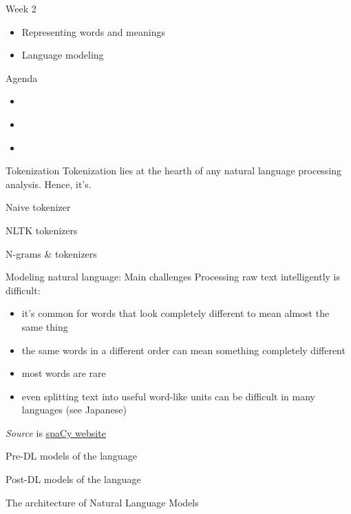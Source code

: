 \begin{frame}{Week 2}
\protect\hypertarget{week-2}{}
\begin{itemize}
\tightlist
\item
  Representing words and meanings
\item
  Language modeling
\end{itemize}
\end{frame}

\begin{frame}{Agenda}
\protect\hypertarget{agenda}{}
\begin{itemize}
\tightlist
\item
  \href{}{}
\item
  \href{}{}
\item
  \href{}{}
\end{itemize}
\end{frame}

\begin{frame}{Tokenization}
\protect\hypertarget{tokenization}{}
Tokenization lies at the hearth of any natural language processing
analysis. Hence, it's.

\begin{block}{Naive tokenizer}
\protect\hypertarget{naive-tokenizer}{}
\end{block}

\begin{block}{NLTK tokenizers}
\protect\hypertarget{nltk-tokenizers}{}
\end{block}

\begin{block}{N-grams \& tokenizers}
\protect\hypertarget{n-grams-tokenizers}{}
\end{block}
\end{frame}

\begin{frame}{Modeling natural language: Main challenges}
\protect\hypertarget{modeling-natural-language-main-challenges}{}
Processing raw text intelligently is difficult:

\begin{itemize}
\tightlist
\item
  it's common for words that look completely different to mean almost
  the same thing
\item
  the same words in a different order can mean something completely
  different
\item
  most words are rare
\item
  even splitting text into useful word-like units can be difficult in
  many languages (see Japanese)
\end{itemize}

\emph{Source} is \href{https://spacy.io/usage/linguistic-features}{spaCy
website}

\begin{block}{Pre-DL models of the language}
\protect\hypertarget{pre-dl-models-of-the-language}{}
\end{block}

\begin{block}{Post-DL models of the language}
\protect\hypertarget{post-dl-models-of-the-language}{}
\end{block}
\end{frame}

\begin{frame}{The architecture of Natural Language Models}
\protect\hypertarget{the-architecture-of-natural-language-models}{}
\end{frame}
